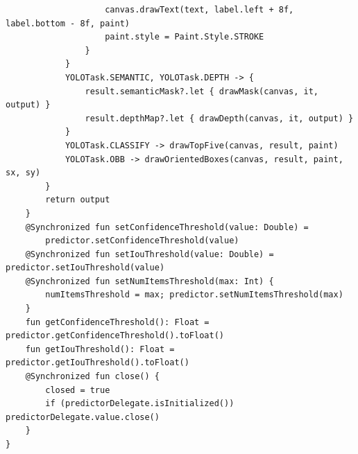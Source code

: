 \begin{verbatim}
                    canvas.drawText(text, label.left + 8f, label.bottom - 8f, paint)
                    paint.style = Paint.Style.STROKE
                }
            }
            YOLOTask.SEMANTIC, YOLOTask.DEPTH -> {
                result.semanticMask?.let { drawMask(canvas, it, output) }
                result.depthMap?.let { drawDepth(canvas, it, output) }
            }
            YOLOTask.CLASSIFY -> drawTopFive(canvas, result, paint)
            YOLOTask.OBB -> drawOrientedBoxes(canvas, result, paint, sx, sy)
        }
        return output
    }
    @Synchronized fun setConfidenceThreshold(value: Double) =
        predictor.setConfidenceThreshold(value)
    @Synchronized fun setIouThreshold(value: Double) = predictor.setIouThreshold(value)
    @Synchronized fun setNumItemsThreshold(max: Int) {
        numItemsThreshold = max; predictor.setNumItemsThreshold(max)
    }
    fun getConfidenceThreshold(): Float = predictor.getConfidenceThreshold().toFloat()
    fun getIouThreshold(): Float = predictor.getIouThreshold().toFloat()
    @Synchronized fun close() {
        closed = true
        if (predictorDelegate.isInitialized()) predictorDelegate.value.close()
    }
}
\end{verbatim}
\endgroup

